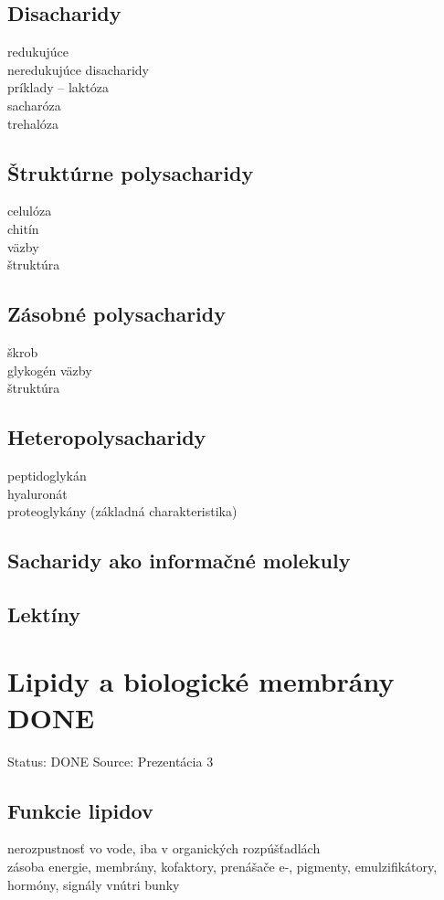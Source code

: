 \subsection*{Disacharidy}
\tab redukujúce\\
\tab neredukujúce disacharidy\\
\tab príklady -- laktóza\\
\tab sacharóza\\
\tab trehalóza\\
\subsection*{Štruktúrne polysacharidy}
\tab celulóza\\
\tab chitín\\
\tab \tab väzby\\
\tab \tab štruktúra\\
\subsection*{Zásobné polysacharidy}
\tab škrob\\
\tab glykogén
\tab \tab väzby\\
\tab \tab štruktúra\\
\subsection*{Heteropolysacharidy}
\tab peptidoglykán\\
\tab hyaluronát\\
\tab proteoglykány (základná charakteristika)\\
\subsection*{Sacharidy ako informačné molekuly}
\subsection*{Lektíny}

\section{Lipidy a biologické membrány DONE}

Status: DONE
Source: Prezentácia 3

\subsection*{Funkcie lipidov}
nerozpustnosť vo vode, iba v organických rozpúšťadlách\\
zásoba energie, membrány, kofaktory, prenášače e-, pigmenty, emulzifikátory, hormóny, signály vnútri bunky\\
